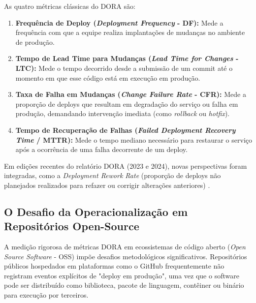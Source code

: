 \documentclass[12pt]{article}
\begin{document}
As quatro métricas clássicas do DORA são:
\begin{enumerate}
    \item \textbf{Frequência de Deploy (\textit{Deployment Frequency} - DF):} Mede a frequência com que a equipe realiza implantações de mudanças no ambiente de produção.
    \item \textbf{Tempo de Lead Time para Mudanças (\textit{Lead Time for Changes} - LTC):} Mede o tempo decorrido desde a submissão de um commit até o momento em que esse código está em execução em produção.
    \item \textbf{Taxa de Falha em Mudanças (\textit{Change Failure Rate} - CFR):} Mede a proporção de deploys que resultam em degradação do serviço ou falha em produção, demandando intervenção imediata (como \textit{rollback} ou \textit{hotfix}).
    \item \textbf{Tempo de Recuperação de Falhas (\textit{Failed Deployment Recovery Time} / MTTR):} Mede o tempo mediano necessário para restaurar o serviço após a ocorrência de uma falha decorrente de um deploy.
\end{enumerate}

Em edições recentes do relatório DORA (2023 e 2024), novas perspectivas foram integradas, como a \textit{Deployment Rework Rate} (proporção de deploys não planejados realizados para refazer ou corrigir alterações anteriores) \cite{dora2024history}.

\subsection{O Desafio da Operacionalização em Repositórios Open-Source}

A medição rigorosa de métricas DORA em ecossistemas de código aberto (\textit{Open Source Software} - OSS) impõe desafios metodológicos significativos. Repositórios públicos hospedados em plataformas como o GitHub frequentemente não registram eventos explícitos de "deploy em produção", uma vez que o software pode ser distribuído como biblioteca, pacote de linguagem, contêiner ou binário para execução por terceiros.
\end{document}
